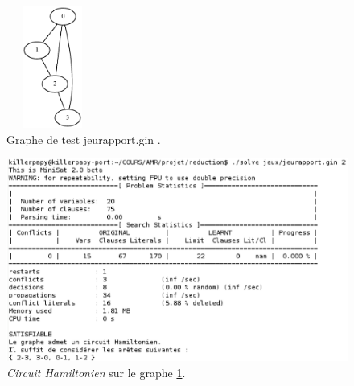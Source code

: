   \begin{figure}[!ht]
   \begin{center}
    \includegraphics[width=3cm,height=4cm]{images/jeurap.ps}
    \caption{Graphe de test jeurapport.gin .\label{graphe1}}
   \end{center}
  \end{figure}

  \begin{figure}[!ht]
   \begin{center}
    \includegraphics[width=12cm]{images/chemin.eps}
    \caption{\emph{Circuit Hamiltonien} sur le graphe
    \ref{graphe1}.\label{ham}}
   \end{center}
  \end{figure}